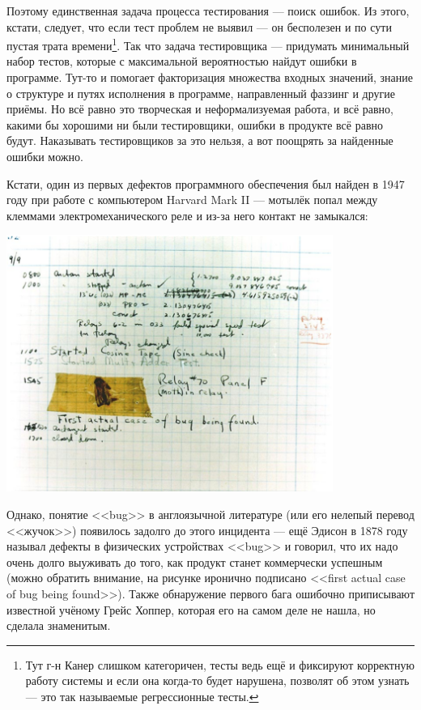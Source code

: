 \documentclass{../../text-style}
\begin{document}
Поэтому единственная задача процесса тестирования --- поиск ошибок. Из этого, кстати, следует, что если тест проблем не выявил --- он бесполезен и по сути пустая трата времени\footnote{Тут г-н Канер слишком категоричен, тесты ведь ещё и фиксируют корректную работу системы и если она когда-то будет нарушена, позволят об этом узнать --- это так называемые регрессионные тесты.}. Так что задача тестировщика --- придумать минимальный набор тестов, которые с максимальной вероятностью найдут ошибки в программе. Тут-то и помогает факторизация множества входных значений, знание о структуре и путях исполнения в программе, направленный фаззинг и другие приёмы. Но всё равно это творческая и неформализуемая работа, и всё равно, какими бы хорошими ни были тестировщики, ошибки в продукте всё равно будут. Наказывать тестировщиков за это нельзя, а вот поощрять за найденные ошибки можно.

Кстати, один из первых дефектов программного обеспечения был найден в 1947 году при работе с компьютером Harvard Mark II --- мотылёк попал между клеммами электромеханического реле и из-за него контакт не замыкался:

\begin{center}
    \includegraphics[width=0.8\textwidth]{bug.png}
\end{center}

Однако, понятие <<bug>> в англоязычной литературе (или его нелепый перевод <<жучок>>) появилось задолго до этого инцидента --- ещё Эдисон в 1878 году называл дефекты в физических устройствах <<bug>> и говорил, что их надо очень долго выуживать до того, как продукт станет коммерчески успешным (можно обратить внимание, на рисунке иронично подписано <<first actual case of bug being found>>). Также обнаружение первого бага ошибочно приписывают известной учёному Грейс Хоппер, которая его на самом деле не нашла, но сделала знаменитым.
\end{document}
